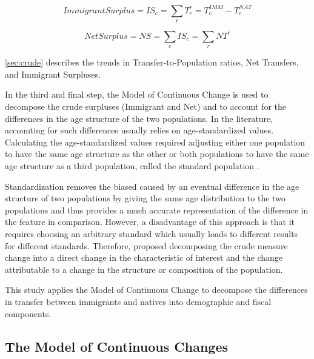 \begin{equation}\label{eq:is}
  Immigrant Surplus=IS_{c}= \displaystyle\sum_{r}T^{r}_{c}=T^{IMM}_{c}-T^{NAT}_{c}
\end{equation}

\begin{equation}\label{eq:ns}
  Net Surplus = NS = \displaystyle\sum_{c}IS_{c} = \displaystyle\sum_{r}NT^{r}
\end{equation}

\autoref{sec:crude} describes the trends in Transfer-to-Population ratios, Net Transfers, and Immigrant Surpluses.

\vspace{0.7em}\par
In the third and final step, the Model of Continuous Change \citep{Horiuchi:2008cn} is used to decompose the crude surpluses (Immigrant and Net) and to account for the differences in the age structure of the two populations.
In the literature, accounting for such differences usually relies on age-standardized values.
Calculating the age-standardized values required adjusting either one population to have the same age structure as the other or both populations to have the same age structure as a third population, called the standard population \citep{statCan:001}.

\vspace{0.7em}\par
Standardization removes the biased caused by an eventual difference in the age structure of two populations by giving the same age distribution to the two populations and thus provides a much accurate representation of the difference in the feature in comparison.
However, a disadvantage of this approach is that it requires choosing an arbitrary standard which usually loads to different results for different standards.
Therefore, \citet{Prskawetz:2005dx} proposed decomposing the crude measure change into a direct change in the characteristic of interest and the change attributable to a change in the structure or composition of the population.

\vspace{0.7em}\par
This study applies the Model of Continuous Change \citep{Horiuchi:2008cn} to decompose the differences in transfer between immigrants and natives into demographic and fiscal components.

\subsection{The Model of Continuous Changes}\label{sec:model}

